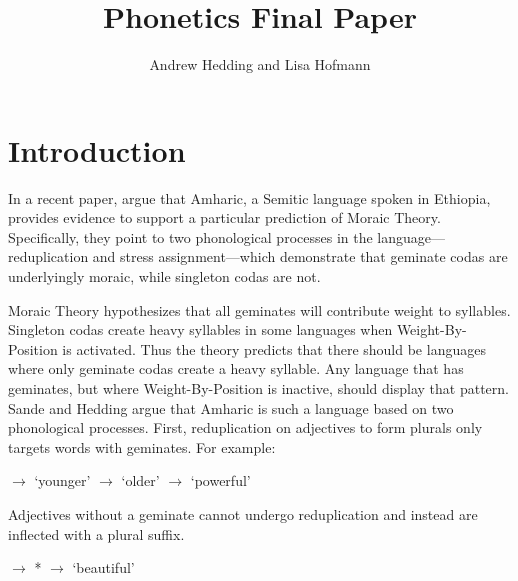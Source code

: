 \documentclass[12pt]{article}
\title{Phonetics Final Paper}
\author{Andrew Hedding and Lisa Hofmann}
\begin{document}
\maketitle
\section{Introduction}

In a recent paper, \cite{sande2017} argue that Amharic, a Semitic language spoken in Ethiopia, provides evidence to support a particular prediction of Moraic Theory. Specifically, they point to two phonological processes in the language---reduplication and stress assignment---which demonstrate that geminate codas are underlyingly moraic, while singleton codas are not. 

Moraic Theory hypothesizes that all geminates will contribute weight to syllables. Singleton codas create heavy syllables in some languages when Weight-By-Position is activated. Thus the theory predicts that there should be languages where only geminate codas create a heavy syllable. Any language that has geminates, but where Weight-By-Position is inactive, should display that pattern. Sande and Hedding argue that Amharic is such a language based on two phonological processes. First, reduplication on adjectives to form plurals only targets words with geminates. For example:

\begin{exe}
\begin{xlist}
\ex 	{} $\rightarrow$  \hspace{1cm} `younger'
\ex 	{} $\rightarrow$  \hspace{1.18cm} `older'
\ex 	{} $\rightarrow$  \hspace{1.37cm} `powerful'
\end{xlist}
\end{exe}

Adjectives without a geminate cannot undergo reduplication and instead are inflected with a plural suffix. 

\begin{exe}
\begin{xlist}
\ex 	{} $\rightarrow$ * 
\ex 	{} $\rightarrow$  \hspace{1cm} `beautiful'
\end{xlist}
\end{exe}
\end{document}
